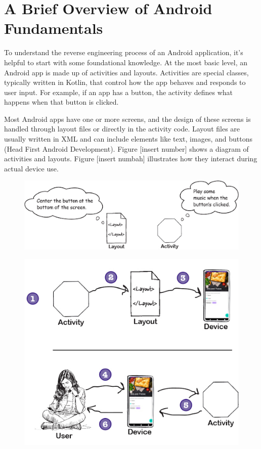 \chapter{A Brief Overview of Android Fundamentals}
To understand the reverse engineering process of an Android application, it’s helpful to start with some foundational knowledge. At the most basic level, an Android app is made up of activities and layouts. Activities are special classes, typically written in Kotlin, that control how the app behaves and responds to user input. For example, if an app has a button, the activity defines what happens when that button is clicked. 

Most Android apps have one or more screens, and the design of these screens is handled through layout files or directly in the activity code. Layout files are usually written in XML and can include elements like text, images, and buttons (Head First Android Development). Figure [insert number] shows a diagram of activities and layouts. Figure [insert numbah] illustrates how they interact during actual device use.
\begin{figure}
	\centering
	\includegraphics[width=0.7\linewidth]{activity_layout}
	\caption{}
	\label{fig:activitylayout}
\end{figure}
\begin{figure}
	\centering
	\includegraphics[width=0.7\linewidth]{activity_layout_process}
	\caption{}
	\label{fig:activitylayoutprocess}
\end{figure}

